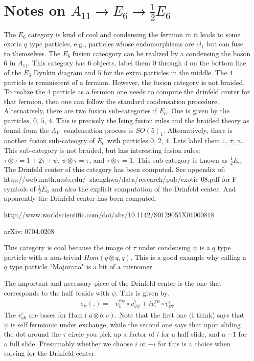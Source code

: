 \documentclass[12pt,a4paper]{article}
\begin{document}
\section{Notes on $A_{11} \rightarrow E_6 \rightarrow \frac{1}{2} E_6$}
The $E_6$ category is kind of cool and condensing the fermion in it leads to some exotic $q$ type particles, e.g., particles whose endomorphisms are $cl_1$ but can fuse to themselves. 
The $E_6$ fusion cateogory can be realized by a condensing the boson $6$ in $A_{11}$. 
This category has $6$ objects, label them $0$ through $4$ on the bottom line of the $E_6$ Dynkin diagram and $5$ for the extra particles in the middle. 
The $4$ particle is reminiscent of a fermion. 
However, the fusion category is not braided. 
To realize the $4$ particle as a fermion one needs to compute the drinfeld center for that fermion, then one can follow the standard condensation procedure.
Alternatively, there are two fusion sub-categories if $E_6$. 
One is given by the particles, $0$, $5$, $4$. 
This is precisely the Ising fusion rules and the braided theory as found from the $A_{11}$ condensation process is $SO(5)_1$.
Alternatively, there is another fusion sub-cateogry of $E_6$ with particles $0$, $2$, $4$. Lets label them $1$, $\tau$, $\psi$. 
This sub-category is not braided, but has interesting fusion rules: $\tau \otimes \tau = 1+ 2\tau + \psi$, $\psi \otimes \tau = \tau$, and $\tau \otimes \tau = 1$. 
This sub-category is known as $\frac{1}{2}E_6$. 
The Drinfeld center of this category has been computed.
See appendix of: http://web.math.ucsb.edu/~zhenghwa/data/research/pub/exotic-08.pdf 
for F-symbols of $\frac{1}{2}E_6$ and also the explicit computation of the Drinfeld center. 
And apparently the Drinfeld center has been computed: 


http://www.worldscientific.com/doi/abs/10.1142/S0129055X01000818

arXiv: 0704.0208

This category is cool because the image of $\tau$ under condensing $\psi$ is a $q$ type particle with a non-trivial $Hom(q\otimes q, q)$. 
This is a good example why calling a $q$ type particle ``Majorana" is a bit of a misnomer. 

The important and necessary piece of the Drinfeld center is the one that corresponds to the half braids with $\psi$. 
This is given by,
\begin{align}
e_{\psi}(. ) = - v^{\psi \psi}_{1} \circ v^{1}_{\psi \psi} + i v^{\tau \psi}_\tau \circ v^{\tau}_{\psi \tau}
\end{align}
The $v^{c}_{ab}$ are bases for $\text{Hom}(a \otimes b, c)$. 
Note that the first one (I think) says that $\psi$ is self fermionic under exchange, while the second one says that upon sliding the dot around the $\tau$ circle you pick up a factor of $i$ for a half slide, and a $-1$ for a full slide. Presumably whether we choose $i$ or $-i$ for this is a choice when solving for the Drinfeld center.
\end{document}

